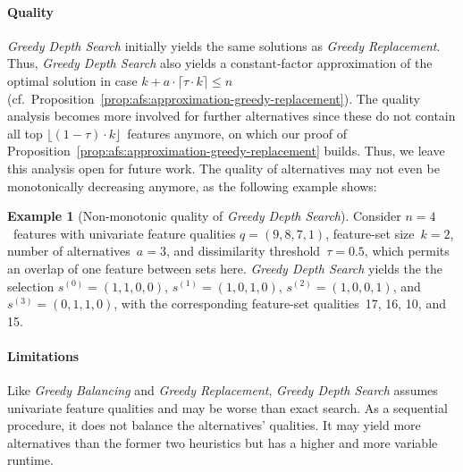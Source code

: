 \documentclass{article}
\theoremstyle{definition}
\newtheorem{example}{Example}
\begin{document}
\paragraph{Quality}

\emph{Greedy Depth Search} initially yields the same solutions as \emph{Greedy Replacement}.
Thus, \emph{Greedy Depth Search} also yields a constant-factor approximation of the optimal solution in case $k + a \cdot \lceil \tau \cdot k \rceil \leq n$ (cf.~Proposition~\ref{prop:afs:approximation-greedy-replacement}).
The quality analysis becomes more involved for further alternatives since these do not contain all top $\lfloor (1 - \tau) \cdot k \rfloor$~features anymore, on which our proof of Proposition~\ref{prop:afs:approximation-greedy-replacement} builds.
Thus, we leave this analysis open for future work.
The quality of alternatives may not even be monotonically decreasing anymore, as the following example shows:
%
\begin{example}[Non-monotonic quality of \emph{Greedy Depth Search}]
	Consider $n=4$~features with univariate feature qualities $q = (9,8,7,1)$, feature-set size~$k=2$, number of alternatives~$a=3$, and dissimilarity threshold~$\tau = 0.5$, which permits an overlap of one feature between sets here.
	\emph{Greedy Depth Search} yields the the selection $s^{(0)} = (1,1,0,0)$, $s^{(1)} = (1,0,1,0)$, $s^{(2)} = (1,0,0,1)$, and $s^{(3)} = (0,1,1,0)$, with the corresponding feature-set qualities~17, 16, 10, and 15.
	\label{ex:afs:greedy-depth:non-monotonic}
\end{example}

\paragraph{Limitations}

Like \emph{Greedy Balancing} and \emph{Greedy Replacement}, \emph{Greedy Depth Search} assumes univariate feature qualities and may be worse than exact search.
As a sequential procedure, it does not balance the alternatives' qualities.
It may yield more alternatives than the former two heuristics but has a higher and more variable runtime.

\renewcommand*{\bibfont}{\small} %
\printbibliography
\end{document}
